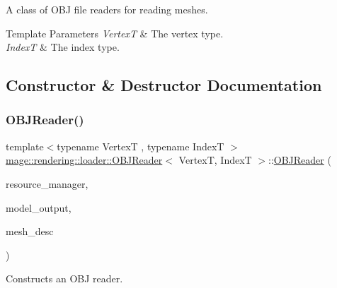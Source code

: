 A class of O\+BJ file readers for reading meshes.


\begin{DoxyTemplParams}{Template Parameters}
{\em VertexT} & The vertex type. \\
\hline
{\em IndexT} & The index type. \\
\hline
\end{DoxyTemplParams}


\subsection{Constructor \& Destructor Documentation}
\mbox{\label{classmage_1_1rendering_1_1loader_1_1_o_b_j_reader_a5fe68a545e05c266b69f35e4dc9027a9}} 
\subsubsection{\texorpdfstring{O\+B\+J\+Reader()}{OBJReader()}\hspace{0.1cm}{\footnotesize\ttfamily [1/3]}}
{\footnotesize\ttfamily template$<$typename VertexT , typename IndexT $>$ \\
\mbox{\hyperlink{classmage_1_1rendering_1_1loader_1_1_o_b_j_reader}{mage\+::rendering\+::loader\+::\+O\+B\+J\+Reader}}$<$ VertexT, IndexT $>$\+::\mbox{\hyperlink{classmage_1_1rendering_1_1loader_1_1_o_b_j_reader}{O\+B\+J\+Reader}} (\begin{DoxyParamCaption}\item[{\mbox{\hyperlink{classmage_1_1rendering_1_1_resource_manager}{Resource\+Manager}} \&}]{resource\+\_\+manager,  }\item[{\mbox{\hyperlink{structmage_1_1rendering_1_1_model_output}{Model\+Output}}$<$ VertexT, IndexT $>$ \&}]{model\+\_\+output,  }\item[{const \mbox{\hyperlink{classmage_1_1rendering_1_1_mesh_descriptor}{Mesh\+Descriptor}}$<$ VertexT, IndexT $>$ \&}]{mesh\+\_\+desc }\end{DoxyParamCaption})\hspace{0.3cm}{\ttfamily [explicit]}}

Constructs an O\+BJ reader.


